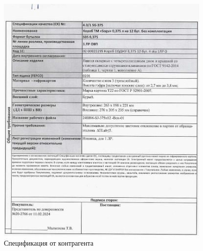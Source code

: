 \begin{figure}
\begin{center}
  \includegraphics[height=0.94\textheight, width=0.94\textwidth, keepaspectratio]{Pics 1/1.1 спецификация от контрагента_0001.jpg }
\end{center}
  \caption{Спецификация от контрагента}
  \label{pic:1.1 спецификация от контрагента_0001}
\end{figure}

